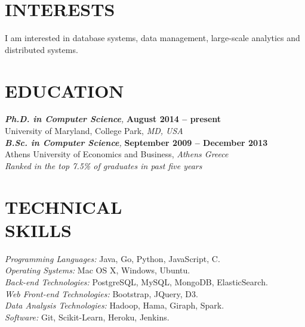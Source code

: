 \documentclass[margin, 10pt]{res} %
\begin{document}
\begin{resume}


\section{INTERESTS}

I am interested in database systems, data management, large-scale analytics and distributed systems.


\section{EDUCATION}

{\sl \textbf{Ph.D. in Computer Science},}  \hfill \textbf{August 2014 -- present} \\
University of Maryland, College Park,  \textit{MD, USA}\\

{\sl \textbf{B.Sc. in Computer Science},}  \hfill \textbf{September 2009 -- December 2013} \\
Athens University of Economics and Business, \textit{Athens Greece}\\
\textit{Ranked in the top 7.5\% of graduates in past five years}


\section{TECHNICAL \\ SKILLS}

{\sl Programming Languages:} Java, Go, Python, JavaScript, C. \\
{\sl Operating Systems:} Mac OS X, Windows, Ubuntu.\\
{\sl Back-end Technologies:} PostgreSQL, MySQL, MongoDB, ElasticSearch. \\
{\sl Web Front-end Technologies:} Bootstrap, JQuery, D3. \\
{\sl Data Analysis Technologies:} Hadoop, Hama, Giraph, Spark.\\
{\sl Software:} Git, Scikit-Learn, Heroku, Jenkins.





\end{resume}
\end{document}
